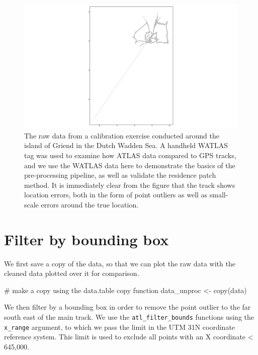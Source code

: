 \documentclass[]{scrreprt}
\newenvironment{Shaded}{}{}
\newcommand{\CommentTok}[1]{\textcolor[rgb]{0.00,0.50,0.00}{#1}}
\newcommand{\KeywordTok}[1]{\textcolor[rgb]{0.00,0.00,1.00}{#1}}
\newcommand{\NormalTok}[1]{#1}
\newcommand{\StringTok}[1]{\textcolor[rgb]{0.00,0.50,0.50}{#1}}
\begin{document}
\begin{figure}
\centering
\includegraphics{figures/fig_calibration_raw.png}
\caption{The raw data from a calibration exercise conducted around the island of Griend in the Dutch Wadden Sea. A handheld WATLAS tag was used to examine how ATLAS data compared to GPS tracks, and we use the WATLAS data here to demonstrate the basics of the pre-processing pipeline, as well as validate the residence patch method. It is immediately clear from the figure that the track shows location errors, both in the form of point outliers as well as small-scale errors around the true location.}
\end{figure}

\hypertarget{filter-by-bounding-box}{%
\section{Filter by bounding box}\label{filter-by-bounding-box}}

We first save a copy of the data, so that we can plot the raw data with the cleaned data plotted over it for comparison.

\begin{Shaded}
\begin{Highlighting}[]
\CommentTok{# make a copy using the data.table copy function}
\NormalTok{data_unproc <-}\StringTok{ }\KeywordTok{copy}\NormalTok{(data)}
\end{Highlighting}
\end{Shaded}

We then filter by a bounding box in order to remove the point outlier to the far south east of the main track. We use the \texttt{atl\_filter\_bounds} functions using the \texttt{x\_range} argument, to which we pass the limit in the UTM 31N coordinate reference system.
This limit is used to exclude all points with an X coordinate \textless{} 645,000.
\end{document}
